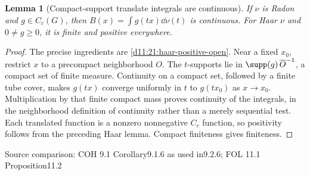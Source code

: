 \documentclass[11pt,oneside,openany]{book}
\newtheorem{lemma}[theorem]{Lemma}
\theoremstyle{definition}
\theoremstyle{remark}
\newcommand{\family}[1]{}
\newcommand{\source}[1]{\par\begingroup\small\sffamily\color{black!65}Source comparison: #1\par\endgroup}
\begin{document}
\begin{lemma}[Compact-support translate integrals are continuous]\family{D11.21.compact_translate_integral_continuity}\label{d11:21:compact-translate-integral-continuity}
If $\nu$ is Radon and $g\in C_c(G)$, then $B(x)=\int g(tx)\dd\nu(t)$ is continuous. For Haar $\nu$ and $0\ne g\ge0$, it is finite and positive everywhere.
\end{lemma}
\begin{proof}
The precise ingredients are \cref{d11:21:haar-positive-open}. Near a fixed $x_0$, restrict $x$ to a precompact neighborhood $O$. The $t$-supports lie in $\supp(g)\,\overline O^{-1}$, a compact set of finite measure. Continuity on a compact set, followed by a finite tube cover, makes $g(tx)$ converge uniformly in $t$ to $g(tx_0)$ as $x\to x_0$. Multiplication by that finite compact mass proves continuity of the integrals, in the neighborhood definition of continuity rather than a merely sequential test. Each translated function is a nonzero nonnegative $C_c$ function, so positivity follows from the preceding Haar lemma. Compact finiteness gives finiteness.
\end{proof}
\source{COH 9.1 Corollary9.1.6 as used in9.2.6; FOL 11.1 Proposition11.2}
\end{document}
